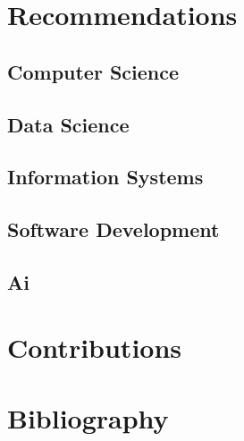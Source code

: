 \documentclass{article}
\begin{document}
	\section{Recommendations}
	\subsection{Computer Science}
	\subsection{Data Science}
	\subsection{Information Systems}
	\subsection{Software Development}
	\subsection{Ai}
	
	
	\section{Contributions}
	
	\section{Bibliography}
	
	
	
\end{document}
